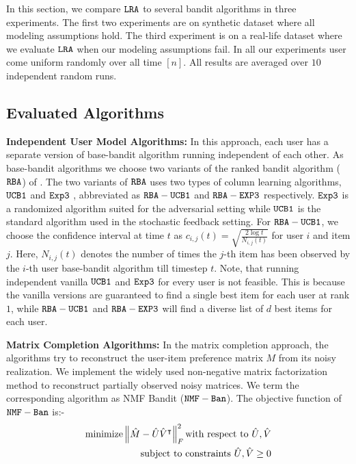 In this section, we compare ${\tt LRA}$ to several bandit algorithms in three experiments. The first two experiments are on synthetic dataset where all modeling assumptions hold. The third experiment is on a real-life dataset where we evaluate ${\tt LRA}$ when our modeling assumptions fail. In all our experiments user come uniform randomly over all time $[n]$. All results are averaged over $10$ independent random runs.

\subsection{Evaluated Algorithms}
\textbf{Independent User Model Algorithms:} In this approach, each user has a separate version of base-bandit algorithm running independent of each other. As base-bandit algorithms we choose two variants of the ranked bandit algorithm (${\tt RBA}$) of \citet{radlinski2008learning}. The two variants of ${\tt RBA}$ uses two types of column learning algorithms, ${\tt UCB1}$ \citep{auer2002finite} and ${\tt Exp3}$ \citep{auer2002nonstochastic}, abbreviated as ${\tt RBA-UCB1}$ and ${\tt RBA-EXP3}$ respectively. ${\tt Exp3}$ is a randomized algorithm suited for the adversarial setting while ${\tt UCB1}$ is the standard algorithm used in the stochastic feedback setting. For ${\tt RBA-UCB1}$, we choose the confidence interval at time $t$ as $c_{i, j}(t) = \sqrt{\frac{ 2\log t}{N_{i, j}(t)}}$ for user $i$ and item $j$. Here, $N_{i, j}(t)$ denotes the number of times the $j$-th item has been observed by the $i$-th user base-bandit algorithm till timestep $t$. Note, that running independent vanilla ${\tt UCB1}$ and ${\tt Exp3}$ for every user is not feasible. This is because the vanilla versions are guaranteed to find a single best item for each user at rank $1$, while ${\tt RBA-UCB1}$ and ${\tt RBA-EXP3}$ will find a diverse list of $d$ best items for each user.



\textbf{Matrix Completion Algorithms:} In the matrix completion approach, the algorithms try to reconstruct the user-item preference matrix $M$ from its noisy realization. We implement the widely used non-negative matrix factorization method to reconstruct partially observed noisy matrices. We term the corresponding algorithm as NMF Bandit (${\tt NMF-Ban}$). The objective function of ${\tt NMF-Ban}$ is:-
\begin{align*}
\text{minimize} \left\lVert\hat{M} - \hat{U}\hat{V}^\intercal\right\rVert_{F}^{2} \text{with respect to $\hat{U}, \hat{V}$}\\
\text{ subject to constraints } \hat{U}, \hat{V} \geq 0
\end{align*}

